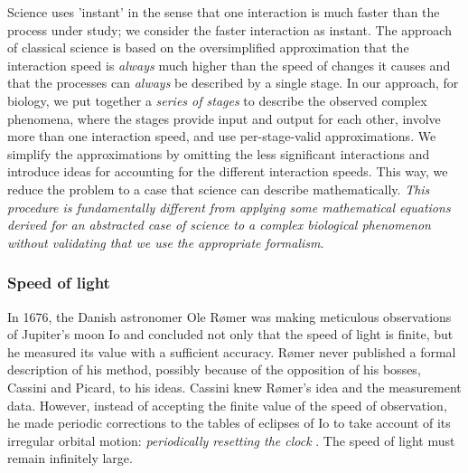 Science uses 'instant' in the sense that one interaction
is much faster than the process under study; we consider the faster interaction as instant.
The approach of classical science is based on the oversimplified
approximation that the interaction speed is \emph{always} much higher
than the speed of changes it causes and that the processes can \emph{always}
be described by a single stage. In our approach, for biology, we put together a
\textit{series of stages} to describe the observed complex phenomena, where the stages provide input and output
for each other, involve more than one interaction speed, and use per-stage-valid
approximations. We simplify the approximations by omitting the less
significant interactions and introduce ideas for accounting for the different
interaction speeds. This way, we reduce the problem to a case that
science can describe mathematically. \emph{This procedure is fundamentally different
from applying some mathematical equations derived for an abstracted
case of science to a complex biological phenomenon without validating
that we use the appropriate formalism}.





\subsubsection[In observations]{Speed of light\label{sec:Physics-SpeedLight}}


In 1676, the Danish astronomer Ole Rømer was making meticulous observations
of Jupiter's moon Io and concluded not only that the speed of light
is finite, but he measured its value with a sufficient accuracy. Rømer
never published a formal description of his method, possibly because
of the opposition of his bosses, Cassini and Picard, to his ideas.
Cassini knew Rømer's idea and the measurement data. However, instead
of accepting the finite value of the speed of observation, he made
periodic corrections to the tables of eclipses of Io to take account
of its irregular orbital motion: \textit{
\hypertarget{ResettingClock}
{periodically resetting the clock}
}.
The speed of light must remain infinitely large.

